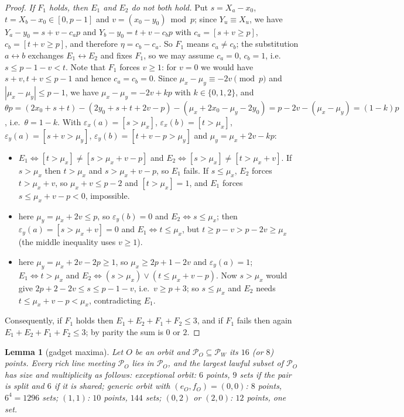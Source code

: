 \documentclass[11pt]{article}
\newtheorem{lemma}[theorem]{Lemma}
\theoremstyle{remark}
\newcommand{\Pset}{\mathcal{P}}
\begin{document}
\begin{proof}
\emph{If $F_1$ holds, then $E_1$ and $E_2$ do not both hold.}  Put $s=X_a-x_0$, $t=X_b-x_0\in[0,p-1]$ and $v=(x_0-y_0)\bmod p$;
since $Y_u\equiv X_u$, we have $Y_a-y_0=s+v-c_ap$ and $Y_b-y_0=t+v-c_bp$ with $c_a=[s+v\ge p]$, $c_b=[t+v\ge p]$, and therefore
$\eta=c_b-c_a$.  So $F_1$ means $c_a\ne c_b$; the substitution $a\leftrightarrow b$ exchanges $E_1\leftrightarrow E_2$ and
fixes $F_1$, so we may assume $c_a=0$, $c_b=1$, i.e.\ $s\le p-1-v<t$.  Note that $F_1$ forces $v\ge1$: for $v=0$ we would have
$s+v,t+v\le p-1$ and hence $c_a=c_b=0$.  Since $\mu_x-\mu_y\equiv-2v\pmod p$ and
$|\mu_x-\mu_y|\le p-1$, we have $\mu_x-\mu_y=-2v+kp$ with $k\in\{0,1,2\}$, and
$\theta p=(2x_0+s+t)-(2y_0+s+t+2v-p)-(\mu_x+2x_0-\mu_y-2y_0)=p-2v-(\mu_x-\mu_y)=(1-k)p$, i.e.\ $\theta=1-k$.
With $\varepsilon_x(a)=[s>\mu_x]$, $\varepsilon_x(b)=[t>\mu_x]$, $\varepsilon_y(a)=[s+v>\mu_y]$, $\varepsilon_y(b)=[t+v-p>\mu_y]$
and $\mu_y=\mu_x+2v-kp$:
\begin{itemize}
\item[$k=1$:] $E_1\Leftrightarrow[t>\mu_x]\ne[s>\mu_x+v-p]$ and $E_2\Leftrightarrow[s>\mu_x]\ne[t>\mu_x+v]$.  If $s>\mu_x$
 then $t>\mu_x$ and $s>\mu_x+v-p$, so $E_1$ fails.  If $s\le\mu_x$, $E_2$ forces $t>\mu_x+v$, so $\mu_x+v\le p-2$ and
 $[t>\mu_x]=1$, and $E_1$ forces $s\le\mu_x+v-p<0$, impossible.
\item[$k=0$:] here $\mu_y=\mu_x+2v\le p$, so $\varepsilon_y(b)=0$ and $E_2\Leftrightarrow s\le\mu_x$; then $\varepsilon_y(a)=[s>\mu_x+v]=0$
 and $E_1\Leftrightarrow t\le\mu_x$, but $t\ge p-v>p-2v\ge\mu_x$ (the middle inequality uses $v\ge1$).
\item[$k=2$:] here $\mu_y=\mu_x+2v-2p\ge1$, so $\mu_x\ge2p+1-2v$ and $\varepsilon_y(a)=1$; $E_1\Leftrightarrow t>\mu_x$ and
 $E_2\Leftrightarrow(s>\mu_x)\vee(t\le\mu_x+v-p)$.  Now $s>\mu_x$ would give $2p+2-2v\le s\le p-1-v$, i.e.\ $v\ge p+3$; so
 $s\le\mu_x$ and $E_2$ needs $t\le\mu_x+v-p<\mu_x$, contradicting $E_1$.
\end{itemize}
Consequently, if $F_1$ holds then $E_1+E_2+F_1+F_2\le3$, and if $F_1$ fails then again $E_1+E_2+F_1+F_2\le3$; by parity the
sum is $0$ or $2$.
\end{proof}

\begin{lemma}[gadget maxima]\label{lem:gadget}
Let $O$ be an orbit and $\Pset_O\subseteq\Pset_W$ its $16$ (or $8$) points.  Every rich line meeting $\Pset_O$ lies in
$\Pset_O$, and the largest lawful subset of $\Pset_O$ has size and multiplicity as follows: exceptional orbit: $6$ points, $9$
sets if the pair is split and $6$ if it is shared; generic orbit with $(e_O,f_O)=(0,0)$: $8$ points, $6^4=1296$ sets;
$(1,1)$: $10$ points, $144$ sets; $(0,2)$ or $(2,0)$: $12$ points, one set.
\end{lemma}
\end{document}
